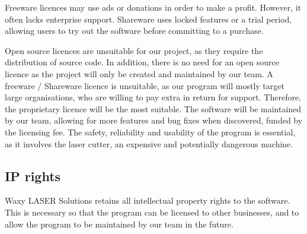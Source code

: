 \documentclass[oneside,openany,11pt,a4paper]{report}
\begin{document}
\noindent {}

Freeware licences may use ads or donations in order to make a profit. However, it often lacks enterprise support. Shareware uses locked features or a trial period, allowing users to try out the software before committing to a purchase. 

Open source licences are unsuitable for our project, as they require the distribution of source code. In addition, there is no need for an open source licence as the project will only be created and maintained by our team. A freeware / Shareware licence is unsuitable, as our program will mostly target large organisations, who are willing to pay extra in return for support. Therefore, the proprietary licence will be the most suitable. The software will be maintained by our team, allowing for more features and bug fixes when discovered, funded by the licensing fee. The safety, reliability and usability of the program is essential, as it involves the laser cutter, an expensive and potentially dangerous machine. 
\subsection{IP rights}
Waxy LASER Solutions retains all intellectual property rights to the software. This is necessary so that the program can be licensed to other businesses, and to allow the program to be maintained by our team in the future. 
\end{document}
